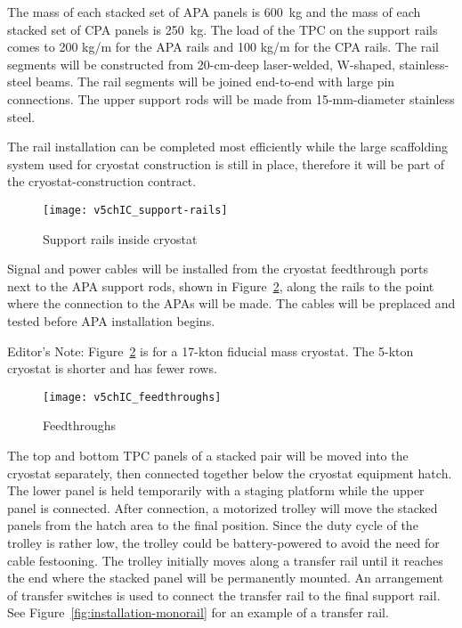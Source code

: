 The mass of each stacked set of APA panels is 600~kg and the mass of each stacked set of CPA panels is 250~kg. The load of the TPC on the support rails comes to 200 kg/m for the APA rails and 100 kg/m for the CPA rails. The rail segments will be constructed from 20-cm-deep laser-welded, W-shaped, stainless-steel beams. The rail segments will be joined end-to-end with large pin connections. The upper support rods will be made from 15-mm-diameter stainless steel.

The rail installation can be completed most efficiently while the large scaffolding system used for cryostat construction is still in place, therefore it will be part of the cryostat-construction contract. 

\begin{figure}[htbp]
\centering
\texttt{[image: v5chIC\_support-rails]}
\caption{Support rails inside cryostat} 
\label{fig:support-rails}
\end{figure}

Signal and power cables will be installed from the cryostat feedthrough ports next to the APA support rods, shown in Figure~\ref{fig:feedthroughs}, along the rails to the point where the connection to the APAs will be made. The cables will be preplaced and tested before APA installation begins. 
\begin{editornote}
Editor's Note: Figure~\ref{fig:feedthroughs} is for a 17-kton fiducial mass cryostat. The 5-kton cryostat is
shorter and has fewer rows.
\end{editornote}




\begin{figure}[htbp]
\centering
\texttt{[image: v5chIC\_feedthroughs]}
\caption{Feedthroughs }
\label{fig:feedthroughs}
\end{figure}

The top and bottom TPC panels of a stacked pair will be moved into the cryostat separately, then connected together below the cryostat equipment hatch. The lower panel is held temporarily with a staging platform while the upper panel is connected.  After connection, a motorized trolley will move the stacked panels from the hatch area to the final position. Since the duty cycle of the trolley is rather low, the trolley could be battery-powered to avoid the need for cable festooning. The trolley initially moves along a transfer rail until it reaches the end where the stacked panel will be permanently mounted. An arrangement of transfer switches is used to connect the transfer rail to the final support rail. See Figure~\ref{fig:installation-monorail} for an example of a transfer rail.


